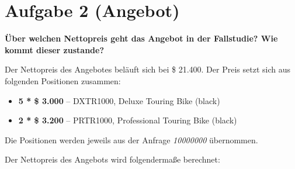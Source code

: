 \section{Aufgabe 2 (Angebot)}
\textbf{Über welchen Nettopreis geht das Angebot in der Fallstudie? Wie kommt dieser zustande?}

Der Nettopreis des Angebotes beläuft sich bei \$ 21.400.
Der Preis setzt sich aus folgenden Positionen zusammen:

\begin{itemize}
  \item \textbf{5 * \$ 3.000} -- DXTR1000, Deluxe Touring Bike (black)
  \item \textbf{2 * \$ 3.200} -- PRTR1000, Professional Touring Bike (black)
\end{itemize}

Die Positionen werden jeweils aus der Anfrage \textit{10000000} übernommen.

Der Nettopreis des Angebots wird folgendermaße berechnet:
\clearpage